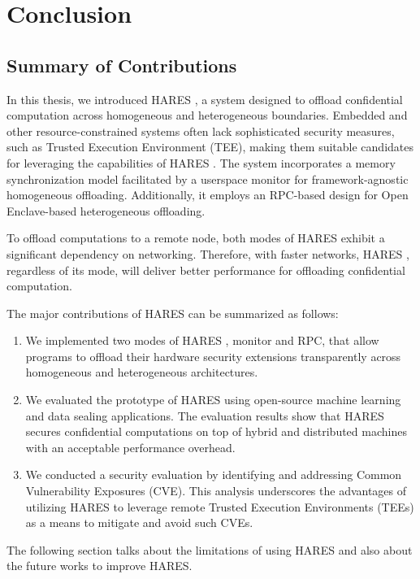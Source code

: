 \documentclass[article, doublespace,nopageskip]{VTthesis} %
\newcommand{\monitor}{HARES }
\begin{document}
    \chapter{Conclusion}
    \section{Summary of Contributions}
    In this thesis, we introduced \monitor, a system designed to offload confidential computation across homogeneous and heterogeneous boundaries. Embedded and other resource-constrained systems often lack sophisticated security measures, such as Trusted Execution Environment (TEE), making them suitable candidates for leveraging the capabilities of \monitor. The system incorporates a memory synchronization model facilitated by a userspace monitor for framework-agnostic homogeneous offloading. Additionally, it employs an RPC-based design for Open Enclave-based heterogeneous offloading.
    
    To offload computations to a remote node, both modes of \monitor exhibit a significant dependency on networking. Therefore, with faster networks, \monitor, regardless of its mode, will deliver better performance for offloading confidential computation.
    
    The major contributions of \monitor can be summarized as follows:
    \begin{enumerate}
        \item We implemented two modes of \monitor, monitor and RPC, that allow programs to offload their hardware security extensions transparently across homogeneous and heterogeneous architectures. 
        \item We evaluated the prototype of \monitor using open-source machine learning and data sealing applications. The evaluation results show that \monitor secures confidential computations on top of hybrid and distributed machines with an acceptable performance overhead.
        \item We conducted a security evaluation by identifying and addressing Common Vulnerability Exposures (CVE). This analysis underscores the advantages of utilizing \monitor to leverage remote Trusted Execution Environments (TEEs) as a means to mitigate and avoid such CVEs.
    \end{enumerate}

    The following section talks about the limitations of using \monitor and also about the future works to improve HARES.
\end{document}
